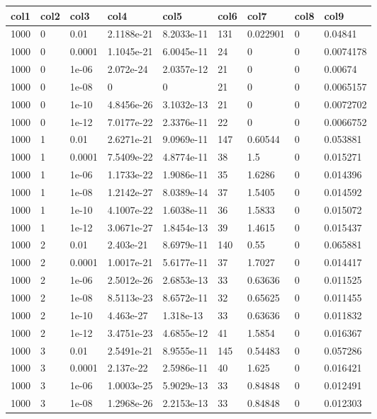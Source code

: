 \begin{tabular}{lllllllll}
col1 & col2 & col3 & col4 & col5 & col6 & col7 & col8 & col9 \\ 
\hline 
1000 & 0 & 0.01 & 2.1188e-21 & 8.2033e-11 & 131 & 0.022901 & 0 & 0.04841 \\ 
1000 & 0 & 0.0001 & 1.1045e-21 & 6.0045e-11 & 24 & 0 & 0 & 0.0074178 \\ 
1000 & 0 & 1e-06 & 2.072e-24 & 2.0357e-12 & 21 & 0 & 0 & 0.00674 \\ 
1000 & 0 & 1e-08 & 0 & 0 & 21 & 0 & 0 & 0.0065157 \\ 
1000 & 0 & 1e-10 & 4.8456e-26 & 3.1032e-13 & 21 & 0 & 0 & 0.0072702 \\ 
1000 & 0 & 1e-12 & 7.0177e-22 & 2.3376e-11 & 22 & 0 & 0 & 0.0066752 \\ 
1000 & 1 & 0.01 & 2.6271e-21 & 9.0969e-11 & 147 & 0.60544 & 0 & 0.053881 \\ 
1000 & 1 & 0.0001 & 7.5409e-22 & 4.8774e-11 & 38 & 1.5 & 0 & 0.015271 \\ 
1000 & 1 & 1e-06 & 1.1733e-22 & 1.9086e-11 & 35 & 1.6286 & 0 & 0.014396 \\ 
1000 & 1 & 1e-08 & 1.2142e-27 & 8.0389e-14 & 37 & 1.5405 & 0 & 0.014592 \\ 
1000 & 1 & 1e-10 & 4.1007e-22 & 1.6038e-11 & 36 & 1.5833 & 0 & 0.015072 \\ 
1000 & 1 & 1e-12 & 3.0671e-27 & 1.8454e-13 & 39 & 1.4615 & 0 & 0.015437 \\ 
1000 & 2 & 0.01 & 2.403e-21 & 8.6979e-11 & 140 & 0.55 & 0 & 0.065881 \\ 
1000 & 2 & 0.0001 & 1.0017e-21 & 5.6177e-11 & 37 & 1.7027 & 0 & 0.014417 \\ 
1000 & 2 & 1e-06 & 2.5012e-26 & 2.6853e-13 & 33 & 0.63636 & 0 & 0.011525 \\ 
1000 & 2 & 1e-08 & 8.5113e-23 & 8.6572e-11 & 32 & 0.65625 & 0 & 0.011455 \\ 
1000 & 2 & 1e-10 & 4.463e-27 & 1.318e-13 & 33 & 0.63636 & 0 & 0.011832 \\ 
1000 & 2 & 1e-12 & 3.4751e-23 & 4.6855e-12 & 41 & 1.5854 & 0 & 0.016367 \\ 
1000 & 3 & 0.01 & 2.5491e-21 & 8.9555e-11 & 145 & 0.54483 & 0 & 0.057286 \\ 
1000 & 3 & 0.0001 & 2.137e-22 & 2.5986e-11 & 40 & 1.625 & 0 & 0.016421 \\ 
1000 & 3 & 1e-06 & 1.0003e-25 & 5.9029e-13 & 33 & 0.84848 & 0 & 0.012491 \\ 
1000 & 3 & 1e-08 & 1.2968e-26 & 2.2153e-13 & 33 & 0.84848 & 0 & 0.012303 \\ 

\end{tabular}
